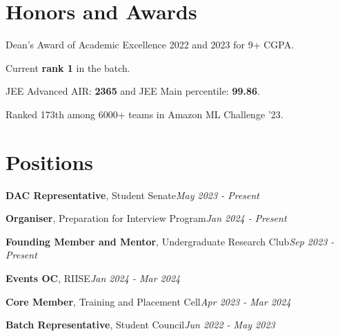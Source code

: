 \documentclass[a4paper,20pt]{article}
\begin{document}
\section{Honors and Awards}
\begin{description}[font=$\bullet$]
\item {Dean's Award of Academic Excellence 2022 and 2023 for 9+ CGPA.}
\vspace{-6pt}
\item {Current \textbf{rank 1} in the batch.}
\vspace{-6pt}
\item{JEE Advanced AIR: \textbf{2365} and JEE Main percentile: \textbf{99.86}.}
\vspace{-6pt}
\item{Ranked 173th among 6000+ teams in Amazon ML Challenge '23.}
\end{description}

\vspace{3pt}
\section{Positions}
\begin{description}[font=$\bullet$]
\item {\textbf{DAC Representative}, Student Senate}\hfill \textit{May 2023 - Present}
\vspace{-6pt}
\item {\textbf{Organiser}, Preparation for Interview Program}\hfill \textit{Jan 2024 - Present}
\vspace{-6pt}
\item {\textbf{Founding Member and Mentor}, Undergraduate Research Club}\hfill \textit{Sep 2023 - Present}
\vspace{-6pt}
\item {\textbf{Events OC}, RIISE}\hfill \textit{Jan 2024 - Mar 2024}
\vspace{-6pt}
\item {\textbf{Core Member}, Training and Placement Cell}\hfill \textit{Apr 2023 - Mar 2024}
\vspace{-6pt}
\item {\textbf{Batch Representative}, Student Council}\hfill \textit{Jun 2022 - May 2023}
\vspace{-6pt}
\end{description}
\end{document}
